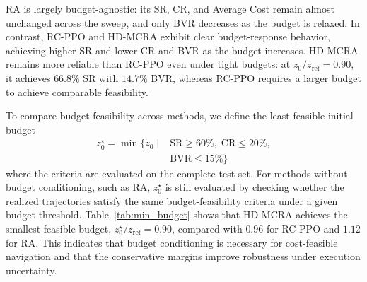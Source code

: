 \documentclass[conference]{IEEEtran}
\begin{document}


RA is largely budget-agnostic: its SR, CR, and Average Cost remain almost unchanged across the sweep, and only BVR decreases as the budget is relaxed. In contrast, RC-PPO and HD-MCRA exhibit clear budget-response behavior, achieving higher SR and lower CR and BVR as the budget increases. HD-MCRA remains more reliable than RC-PPO even under tight budgets: at $z_0/z_{\mathrm{ref}}=0.90$, it achieves $66.8\%$ SR with $14.7\%$ BVR, whereas RC-PPO requires a larger budget to achieve comparable feasibility.

To compare budget feasibility across methods, we define the least feasible initial budget
\begin{equation}
\begin{aligned}
z_0^\star
= \min \Big\{ z_0 \;\Big|\; &\mathrm{SR}\ge 60\%,\; \mathrm{CR}\le 20\%, \\
&\mathrm{BVR}\le 15\% \Big\}
\end{aligned}
\end{equation}
where the criteria are evaluated on the complete test set. For methods without budget conditioning, such as RA, $z_0^\star$ is still evaluated by checking whether the realized trajectories satisfy the same budget-feasibility criteria under a given budget threshold. Table~\ref{tab:min_budget} shows that HD-MCRA achieves the smallest feasible budget, $z_0^\star/z_{\mathrm{ref}}=0.90$, compared with $0.96$ for RC-PPO and $1.12$ for RA. This indicates that budget conditioning is necessary for cost-feasible navigation and that the conservative margins improve robustness under execution uncertainty.

\begin{table}[t]
\caption{Search result for the minimum feasible normalized initial budget.}
\label{tab:min_budget}
\centering
{}
\end{table}
\end{document}
